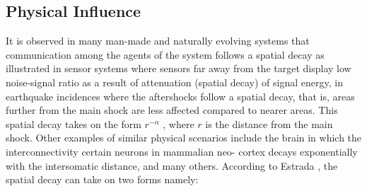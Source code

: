 \documentclass[10pt,a4paper]{article}
\begin{document}
    	    	\subsection{Physical Influence}
    	    	It is observed in many man-made and naturally evolving systems that communication among the agents of the system follows a spatial decay as illustrated in sensor systems where sensors far away from the target display low noise-signal ratio as a result of attenuation (spatial decay) of signal energy, in earthquake incidences where the aftershocks follow a spatial decay, that is, areas further from the main shock are less affected compared to nearer areas. This spatial decay takes on the form $r ^{-\alpha}$ , where $r$ is the distance from the main shock. Other examples of similar physical scenarios include the brain in which the interconnectivity certain neurons in mammalian neo-
    	    	cortex decays exponentially with the intersomatic distance, and many others.
    	    	According to Estrada \citep{estrada2012path}, the spatial decay can take on two forms namely:
    	    	
\end{document}
